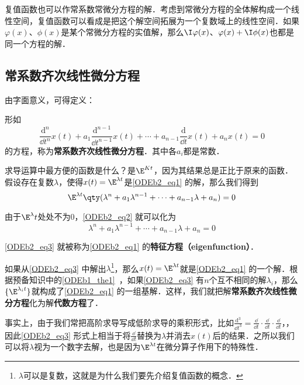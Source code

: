 复值函数也可以作常系数常微分方程的解．考虑到常微分方程的全体解构成一个线性空间，复值函数可以看成是把这个解空间拓展为一个复数域上的线性空间．如果$\varphi(x)$、$\phi(x)$是某个常微分方程的实值解，那么$\I\varphi(x)$、$\varphi(x)+\I \phi(x)$也都是同一个方程的解．


\subsection{常系数齐次线性微分方程}

由字面意义，可得定义：
\begin{definition}{}
形如
\begin{equation}\label{ODEb2_eq1}
\frac{\mathrm{d}^n}{\dd t^n}x(t)+a_1\frac{\mathrm{d}^{n-1}}{\dd t^{n-1}}x(t)+\cdots+a_{n-1}\frac{\mathrm{d}}{\dd t}x(t)+a_nx(t)=0
\end{equation}
的方程，称为\textbf{常系数齐次线性微分方程}．其中各$a_i$都是常数．
\end{definition}

求导运算中最方便的函数是什么？是$\E^{Kt}$，因为其结果总是正比于原来的函数．假设存在复数$\lambda$，使得$x(t)=\E^{\lambda t}$是\autoref{ODEb2_eq1} 的解，那么我们得到
\begin{equation}\label{ODEb2_eq2}
\E^{\lambda t}\qty(\lambda^n+a_1\lambda^{n-1}+\cdots+a_{n-1}\lambda+a_n)=0
\end{equation}

由于$\E^\lambda t$处处不为$0$，\autoref{ODEb2_eq2} 就可以化为
\begin{equation}\label{ODEb2_eq3}
\lambda^n+a_1\lambda^{n-1}+\cdots+a_{n-1}\lambda+a_n=0
\end{equation}

\autoref{ODEb2_eq3} 就被称为\autoref{ODEb2_eq1} 的\textbf{特征方程（eigenfunction）}．

如果从\autoref{ODEb2_eq3} 中解出$\lambda$\footnote{$\lambda$可以是复数，这就是为什么我们要先介绍复值函数的概念．}，那么$x(t)=\E^{\lambda t}$就是\autoref{ODEb2_eq1} 的一个解．根据预备知识中的\autoref{ODEb1_the1}~，如果\autoref{ODEb2_eq3} 有$n$个互不相同的解$\lambda_i$，那么$\{\E^{\lambda_i t}\}$就构成了\autoref{ODEb2_eq1} 的一组基解．这样，我们就把解\textbf{常系数齐次线性微分方程}化为解\textbf{代数方程}了．


事实上，由于我们常把高阶求导写成低阶求导的乘积形式，比如$\frac{\mathrm{d}^3}{\dd t^3}=\frac{\dd }{\dd t}\cdot\frac{\dd }{\dd t}\cdot\frac{\dd }{\dd t}$，，因此\autoref{ODEb2_eq3} 形式上相当于将$\frac{\dd }{\dd t}$替换为$\lambda$并消去$x(t)$后的结果．之所以我们可以将$\lambda$视为一个数字去解，也是因为$\E^{\lambda t}$在微分算子作用下的特殊性．



